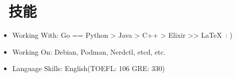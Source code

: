 \documentclass{resume}
\begin{document}

\section{\faCogs\ 技能}
\begin{itemize}[parsep=0.5ex]
  \item Working With: Go == Python > Java > C++ > Elixir >> \LaTeX\ : )
  \item Working On: Debian, Podman, Nerdctl, etcd, etc.
  \item Language Skills: English(TOEFL: 106 \enspace GRE: 330)
\end{itemize}



%
%
\end{document}
